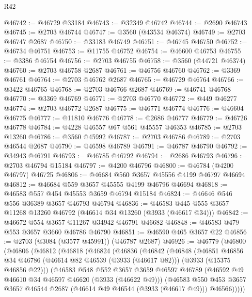 \begin{lexlean}{R42}
\begin{coremodule}
@46742 := @46729 @33184
@46743 := @32349 @46742
@46744 := @2690 @46743
@46745 := @2703 @46744
@46747 := @3560 (@43534 @46374)
@46749 := @2703 @46747 @2687
@46750 := @33183 @46749
@46751 := @46745 @46750
@46752 := @46734 @46751
@46753 := @11755 @46752
@46754 := @46600 @46753
@46755 := @3386 @46754
@46756 := @2703 @46755
@46758 := @3560 (@44721 @46374)
@46760 := @2703 @46758 @2687
@46761 := @46756 @46760
@46762 := @3369 @46761
@46764 := @2703 @46762 @2687
@46765 := @46729 @46764
@46766 := @3422 @46765
@46768 := @2703 @46766 @2687
@46769 := @46741 @46768
@46770 := @3369 @46769
@46771 := @2703 @46770
@46772 := @449 @46277
@46774 := @2703 @46772 @2687
@46775 := @46771 @46774
@46776 := @46604 @46775
@46777 := @11810 @46776
@46778 := @2686 @46777
@46779 := @46726 @46778
@46784 := @4228 @46557 @67 @561 @45557 @46353
@46785 := @2703 @13260
@46786 := @3560 @45992
@46787 := @2703 @46786
@46789 := @2703 @46544 @2687
@46790 := @46598 @46789
@46791 := @46787 @46790
@46792 := @34943 @46791
@46793 := @46785 @46792
@46794 := @2686 @46793
@46796 := @2703 @46794 @15184
@46797 := @4200 @46796
@46800 := @46784 (@4200 @46797) @46725
@46806 := @46684 @560 @3657 @45556 @4199 @46797 @46694
@46812 := @46684 @559 @3657 @45555 @4199 @46796 @46694
@46818 := @46583 @557 @454 @45553 @3659 @46794 @15184
@46824 := @46646 @546 @556 @36389 @3657 @46793 @46794
@46836 := @46583 @445 @555 @3657 @11268 @13260 @46792 (@46614 @34 @13260 (@3933 (@46617 @34)))
@46842 := @46672 @554 @3657 @11267 @34942 @46791 @46682
@46848 := @46583 @479 @553 @3657 @3660 @46786 @46790
@46851 := @46590 @465 @3657 @22
@46856 := @2703 (@3084 (@3577 @45991)) (@46787 @2687)
@46926 := @46779
    (@46800
      (@46806
        (@46812
          (@46818
            (@46824
              (@46836
                (@46842
                  (@46848
                    (@46851
                      @46856
                      @34
                      @46786
                      (@46614 @82 @46539 (@3933 (@46617 @82)))
                      (@3933 (@15375 @46856 @22)))
                    (@46583
                      @548
                      @552
                      @3657
                      @3659
                      @46597
                      @46789
                      (@46592 @49 @46610 @34 @46597 @46620 (@3933 (@46622 @49)))
                      (@46583
                        @550
                        @453
                        @3657
                        @3657
                        @46544
                        @2687
                        (@46614 @49 @46544 (@3933 (@46617 @49)))
                        @46566)))))

\end{coremodule}
\end{lexlean}
